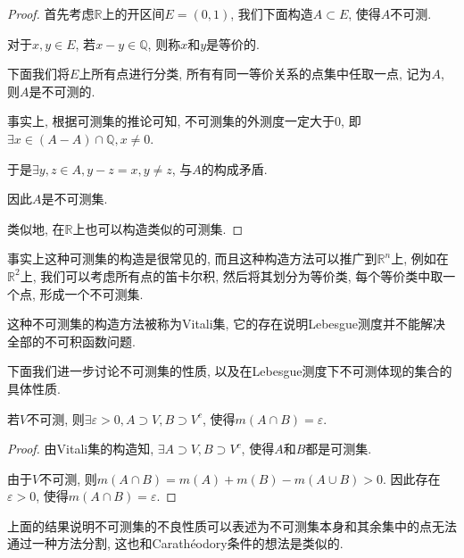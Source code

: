 \documentclass[theorem=false,mathfont=none,openany,sub3section]{easybook}
\begin{document}
\begin{proof}
  首先考虑$\mathbb{R}$上的开区间$E=(0,1)$, 我们下面构造$A\subset E$, 使得$A$不可测.\par
  对于$x,y \in E$, 若$x-y \in \mathbb{Q}$, 则称$x$和$y$是等价的.\par
  下面我们将$E$上所有点进行分类, 所有有同一等价关系的点集中任取一点, 记为$A$, 则$A$是不可测的.\par
  事实上, 根据可测集的推论可知, 不可测集的外测度一定大于0, 即$\exists x\in \left(A-A\right)\cap \mathbb{Q}, x\ne 0$.\par
  于是$\exists y,z \in A, y-z=x, y\ne z$, 与$A$的构成矛盾.\par
  因此$A$是不可测集.\par
  类似地, 在$\mathbb{R}$上也可以构造类似的可测集.\par
\end{proof}

\begin{remark}
  事实上这种可测集的构造是很常见的, 而且这种构造方法可以推广到$\mathbb{R}^n$上, 例如在$\mathbb{R}^2$上, 我们可以考虑所有点的笛卡尔积, 然后将其划分为等价类, 每个等价类中取一个点, 形成一个不可测集.\par
  这种不可测集的构造方法被称为Vitali集, 它的存在说明Lebesgue测度并不能解决全部的不可积函数问题.\par
\end{remark}

下面我们进一步讨论不可测集的性质, 以及在Lebesgue测度下不可测体现的集合的具体性质.\par

\begin{proposition}
  若$V$不可测, 则$\exists \varepsilon >0, A\supset V, B\supset V^c$, 使得$m(A\cap B)=\varepsilon$.\par
\end{proposition}

\begin{proof}
  由Vitali集的构造知, $\exists A\supset V, B\supset V^c$, 使得$A$和$B$都是可测集.\par
  由于$V$不可测, 则$m(A\cap B)=m(A)+m(B)-m(A\cup B)>0$. 因此存在$\varepsilon >0$, 使得$m(A\cap B)=\varepsilon$.\par
\end{proof}

\begin{remark}
  上面的结果说明不可测集的不良性质可以表述为不可测集本身和其余集中的点无法通过一种方法分割, 这也和Carathéodory条件的想法是类似的.\par
\end{remark}
\end{document}
